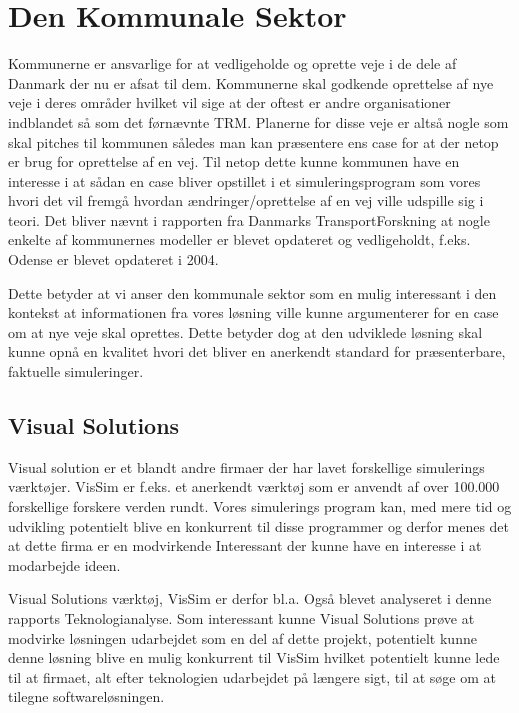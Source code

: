 \section {Den Kommunale Sektor} \label{DenKommunaleSektor}
Kommunerne er ansvarlige for at vedligeholde og oprette veje i de dele af Danmark der nu er afsat til dem. Kommunerne skal godkende oprettelse af nye veje i deres områder hvilket vil sige at der oftest er andre organisationer indblandet så som det førnævnte TRM. Planerne for disse veje er altså nogle som skal pitches til kommunen således man kan præsentere ens case for at der netop er brug for oprettelse af en vej. Til netop dette kunne kommunen have en interesse i at sådan en case bliver opstillet i et simuleringsprogram som vores hvori det vil fremgå hvordan ændringer/oprettelse af en vej ville udspille sig i teori. Det bliver nævnt i rapporten fra Danmarks TransportForskning at nogle enkelte af kommunernes modeller er blevet opdateret og vedligeholdt, f.eks. Odense er blevet opdateret i 2004. \cite{dtfnotat}

\vspace{5mm}

Dette betyder at vi anser den kommunale sektor som en mulig interessant i den kontekst at informationen fra vores løsning ville kunne argumenterer for en case om at nye veje skal oprettes. Dette betyder dog at den udviklede løsning skal kunne opnå en kvalitet hvori det bliver en anerkendt standard for præsenterbare, faktuelle simuleringer.

\subsection*{Visual Solutions}
Visual solution er et blandt andre firmaer der har lavet forskellige simulerings værktøjer. VisSim er f.eks. et anerkendt værktøj som er anvendt af over 100.000 forskellige forskere verden rundt\cite{VisualSolutions}.
Vores simulerings program kan, med mere tid og udvikling potentielt blive en konkurrent til disse programmer og derfor menes det at dette firma er en modvirkende Interessant der kunne have en interesse i at modarbejde ideen.

\vspace{5mm}

Visual Solutions værktøj, VisSim er derfor bl.a. Også blevet analyseret i denne rapports Teknologianalyse. Som interessant kunne Visual Solutions prøve at modvirke løsningen udarbejdet som en del af dette projekt, potentielt kunne denne løsning blive en mulig konkurrent til VisSim hvilket potentielt kunne lede til at firmaet, alt efter teknologien udarbejdet på længere sigt, til at søge om at tilegne softwareløsningen.


